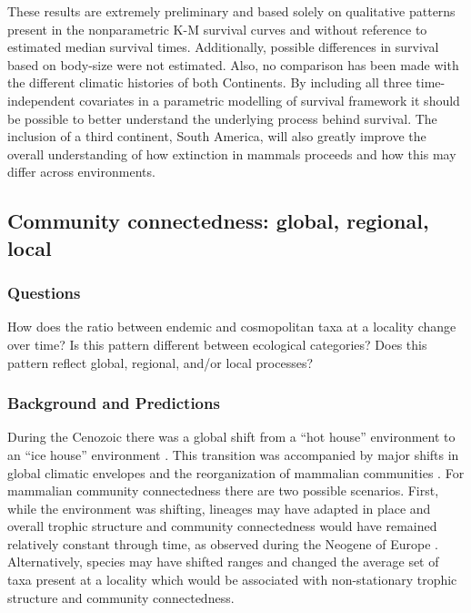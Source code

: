 \documentclass[12pt,letterpaper]{article}
\begin{document}
These results are extremely preliminary and based solely on qualitative patterns present in the nonparametric K-M survival curves and without reference to estimated median survival times. Additionally, possible differences in survival based on body-size were not estimated. Also, no comparison has been made with the different climatic histories of both Continents. By including all three time-independent covariates in a parametric modelling of survival framework it should be possible to better understand the underlying process behind survival. The inclusion of a third continent, South America, will also greatly improve the overall understanding of how extinction in mammals proceeds and how this may differ across environments.


\subsection{Community connectedness: global, regional, local} \label{sec:mamcom}

\subsubsection{Questions} \label{sec:mamcomques}
How does the ratio between endemic and cosmopolitan taxa at a locality change over time? Is this pattern different between ecological categories? Does this pattern reflect global, regional, and/or local processes? 

\subsubsection{Background and Predictions} \label{sec:mamcomback}
During the Cenozoic there was a global shift from a ``hot house'' environment to an ``ice house'' environment \citep{Zachos2008,Zachos2001}. This transition was accompanied by major shifts in global climatic envelopes and the reorganization of mammalian communities \citep{Janis1993a,Fortelius2002,Blois2009,Alroy2000g,Figueirido2012}. For mammalian community connectedness there are two possible scenarios. First, while the environment was shifting, lineages may have adapted in place and overall trophic structure and community connectedness would have remained relatively constant through time, as observed during the Neogene of Europe \citep{Jernvall2004}. Alternatively, species may have shifted ranges and changed the average set of taxa present at a locality which would be associated with non-stationary trophic structure and community connectedness.
\end{document}
